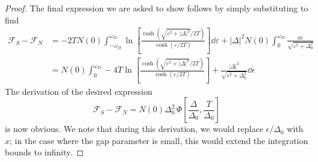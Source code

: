 \begin{proof}
The final expression we are asked to show follows by simply  substituting to find
\begin{align*}
	\mathcal{F}_S - \mathcal{F}_N &= -2T N(0) \int_{-\omega_D}^{\omega_D}
	\ln\!\left[
	\frac{\cosh\!\left(\sqrt{\varepsilon^2+|\Delta|^2}/2T\right)}
	{\cosh(\varepsilon/2T)}
	\right] \dd\varepsilon
	+ |\Delta|^2N(0)\int_0^{\omega_D} \frac{\dd\varepsilon}{\sqrt{\varepsilon^2+\Delta_0^2}}\\
	&=N(0)\int_0^{\omega_D} -4T\ln\!\left[
	\frac{\cosh\!\left(\sqrt{\varepsilon^2+|\Delta|^2}/2T\right)}
	{\cosh(\varepsilon/2T)}\right] + \frac{|\Delta|^2}{\sqrt{\epsilon^2+\Delta_0^2}}\dd{\epsilon}
\end{align*}
The derivation of the desired expression
\[\mathcal{F}_S - \mathcal{F}_N =
N(0)\Delta_0^2\,
\Phi\!\left[\frac{\Delta}{\Delta_0},\frac{T}{\Delta_0}\right]\]
is now obvious. We note that during this derivation, we would replace $\epsilon/ \Delta_0$ with $x$; in the case where the gap parameter is small, this would extend the integration bounds to infinity.
\end{proof}

